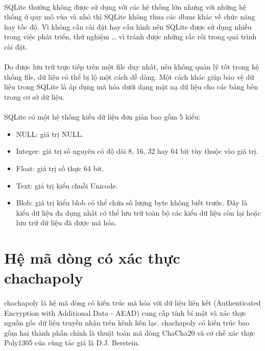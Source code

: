 \paragraph{}
SQLite thường không được sử dụng với các hệ thống lớn nhưng với những hệ thống ở quy mô vùa và nhỏ thì SQLite không thua các \gls{dbms} khác về chức năng hay tốc độ. Vì không cần cài đặt hay cấu hình nên SQLite được sử dụng nhiều trong việc phát triển, thử nghiệm … vì tránh được những rắc rối trong quá trình cài đặt.

\paragraph{}
Do được lưu trữ trực tiếp trên một file duy nhất, nếu không quản lý tốt trong hệ thống file, dữ liệu có thể bị lộ một cách dễ dàng. Một cách khác giúp bảo vệ dữ liệu trong SQLite là áp dụng mã hóa dưới dạng mặt nạ dữ liệu cho các bảng bên trong cơ sở dữ liệu.

\paragraph{}
SQLite có một hệ thống kiểu dữ liệu đơn giản bao gồm 5 kiểu:
\begin{itemize}
	\item NULL: giá trị NULL.
	\item Integer: giá trị số nguyên có độ dài 8, 16, 32 hay 64 bit tùy thuộc vào giá trị.
	\item Float: giá trị số thực 64 bit.
	\item Text: giá trị kiểu chuỗi Unicode.
	\item Blob: giá trị kiểu blob có thể chứa số lượng byte không biết trước. Đây là kiểu dữ liệu đa dụng nhất có thể lưu trữ toàn bộ các kiểu dữ liệu còn lại hoặc lưu trữ dữ liệu đã được mã hóa.
\end{itemize}

\section{Hệ mã dòng có xác thực \Gls{chachapoly}}

\paragraph{}
\Gls{chachapoly} là hệ mã dòng có kiến trúc mã hóa với dữ liệu liên kết (Authenticated Encryption with Additional Data - AEAD) cung cấp tính bí mật và xác thực nguồn gốc dữ liệu truyền nhận trên kênh liên lạc.
\Gls{chachapoly} có kiến trúc bao gồm hai thành phần chính là thuật toán mã dòng ChaCha20 và cơ chế xác thực Poly1305 của cùng tác giả là D.J. Berstein.

